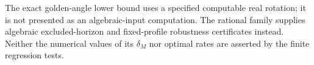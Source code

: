 The exact golden-angle lower bound uses a specified computable real
rotation; it is not presented as an algebraic-input computation. The
rational family supplies algebraic excluded-horizon and fixed-profile
robustness certificates instead. Neither the numerical values of its
$\delta_M$ nor optimal rates are asserted by the finite regression tests.
